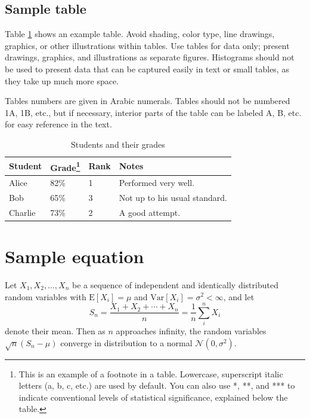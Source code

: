 \documentclass[10pt,twocolumn,twoside,lineno]{gsajnl}
\begin{document}

\subsection{Sample table}

Table \ref{tab:shape-functions} shows an example table. Avoid shading, color type, line drawings, graphics, or other illustrations within tables. Use tables for data only; present drawings, graphics, and illustrations as separate figures. Histograms should not be used to present data that can be captured easily in text or small tables, as they take up much more space.

Tables numbers are given in Arabic numerals. Tables should not be numbered 1A, 1B, etc., but if necessary, interior parts of the table can be labeled A, B, etc. for easy reference in the text.

\begin{table}[p]
\centering
\caption{Students and their grades}
\begin{tableminipage}{\textwidth}
\begin{tabularx}{\textwidth}{@{}XXXX@{}}
\hline
{\bf Student} & {\bf Grade}\footnote{This is an example of a footnote in a table. Lowercase, superscript italic letters (a, b, c, etc.) are used by default. You can also use *, **, and *** to indicate conventional levels of statistical significance, explained below the table.} & {\bf Rank} & {\bf Notes} \\
\hline
Alice & 82\% & 1 & Performed very well.\\
Bob & 65\% & 3 & Not up to his usual standard.\\
Charlie & 73\% & 2 & A good attempt.\\
\hline
\end{tabularx}
  \label{tab:shape-functions}
\end{tableminipage}
\end{table}

\section{Sample equation}

Let $X_1, X_2, \ldots, X_n$ be a sequence of independent and identically distributed random variables with $\text{E}[X_i] = \mu$ and $\text{Var}[X_i] = \sigma^2 < \infty$, and let
\begin{equation}
S_n = \frac{X_1 + X_2 + \cdots + X_n}{n}
      = \frac{1}{n}\sum_{i}^{n} X_i
\label{eq:refname1}
\end{equation}
denote their mean. Then as $n$ approaches infinity, the random variables $\sqrt{n}(S_n - \mu)$ converge in distribution to a normal $\mathcal{N}(0, \sigma^2)$.
\end{document}
